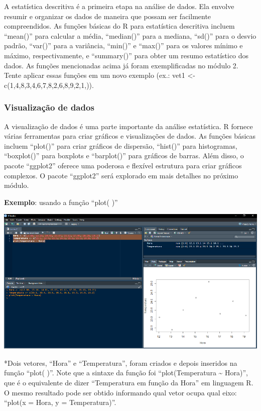 \documentclass[
]{book}
\begin{document}
A estatística descritiva é a primeira etapa na análise de dados. Ela envolve resumir e organizar os dados de maneira que possam ser facilmente compreendidos. As funções básicas do R para estatística descritiva incluem ``mean()'' para calcular a média, ``median()'' para a mediana, ``sd()'' para o desvio padrão, ``var()'' para a variância, ``min()'' e ``max()'' para os valores mínimo e máximo, respectivamente, e ``summary()'' para obter um resumo estatístico dos dados. As funções mencionadas acima já foram exemplificadas no módulo 2. Tente aplicar essas funções em um novo exemplo (ex.: vet1 \textless- c(1,4,8,3,4,6,7,8,2,6,8,9,2,1,)).

\subsubsection{Visualização de dados}\label{visualizauxe7uxe3o-de-dados}

A visualização de dados é uma parte importante da análise estatística. R fornece várias ferramentas para criar gráficos e visualizações de dados. As funções básicas incluem ``plot()'' para criar gráficos de dispersão, ``hist()'' para histogramas, ``boxplot()'' para boxplots e ``barplot()'' para gráficos de barras. Além disso, o pacote ``ggplot2'' oferece uma poderosa e flexível estrutura para criar gráficos complexos. O pacote ``ggplot2'' será explorado em mais detalhes no próximo módulo.

\textbf{Exemplo}: usando a função ``plot( )''

\includegraphics{images/clipboard-3607661657.png}

*Dois vetores, ``Hora'' e ``Temperatura'', foram criados e depois inseridos na função ``plot( )''. Note que a sintaxe da função foi ``plot(Temperatura \textasciitilde{} Hora)'', que é o equivalente de dizer ``Temperatura em função da Hora'' em linguagem R. O mesmo resultado pode ser obtido informando qual vetor ocupa qual eixo: ``plot(x = Hora, y = Temperatura)''.
\end{document}
